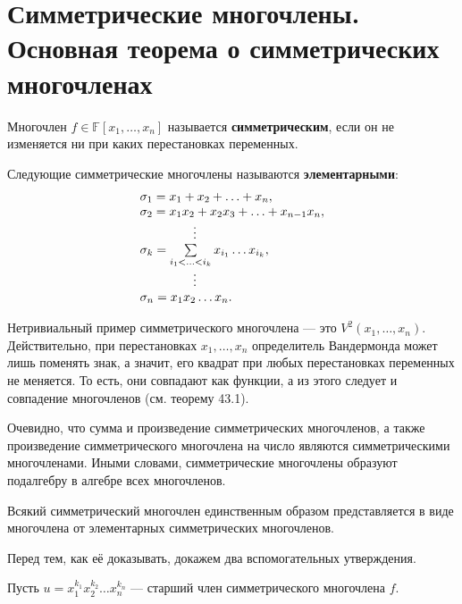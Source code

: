 \section{Симметрические многочлены. Основная теорема о симметрических многочленах}

\begin{definition}
    Многочлен $f \in \mathbb{F}[x_1, \ldots, x_n]$ называется \textbf{симметрическим}, если он не изменяется ни при каких перестановках переменных.
\end{definition}

\begin{definition}
    Следующие симметрические многочлены называются \textbf{элементарными}:
    $$
    \begin{array}{l}
        \sigma_1 = x_1 + x_2 + \ldots + x_n,\\
        \sigma_2 = x_1x_2 + x_2x_3 + \ldots + x_{n - 1}x_n,\\
        \hspace{1.5cm}\vdots\\
        \sigma_k = \sum\limits_{i_1 < \ldots < i_k} x_{i_1}\ldots x_{i_k},\\
        \hspace{1.5cm}\vdots\\
        \sigma_n = x_1x_2\ldots x_n.
    \end{array}
    $$
\end{definition}

Нетривиальный пример симметрического многочлена --- это $V^2(x_1, \ldots, x_n)$. Действительно, при перестановках $x_1, \ldots, x_n$ определитель Вандермонда может лишь поменять знак, а значит, его квадрат при любых перестановках переменных не меняется. То есть, они совпадают как функции, а из этого следует и совпадение многочленов (см. теорему 43.1). 

Очевидно, что сумма и произведение симметрических многочленов, а также произведение симметрического многочлена на число являются симметрическими многочленами. Иными словами, симметрические многочлены образуют подалгебру в алгебре всех многочленов.

\begin{theorem}
    Всякий симметрический многочлен единственным образом представляется в виде многочлена от элементарных симметрических многочленов.
\end{theorem}

Перед тем, как её доказывать, докажем два вспомогательных утверждения.

\begin{lemma}
    Пусть $u = x_1^{k_1}x_2^{k_2}\ldots x_n^{k_n}$ --- старший член симметрического многочлена $f$.
\end{lemma}

